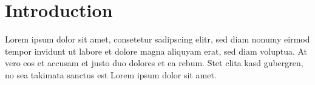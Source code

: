 \documentclass{article}
\begin{document}
\chapter{Introduction}
Lorem ipsum dolor sit amet, consetetur sadipscing elitr, sed diam nonumy eirmod
tempor invidunt ut labore et dolore magna aliquyam erat, sed diam voluptua. At
vero eos et accusam et justo duo dolores et ea rebum. Stet clita kasd
gubergren, no sea takimata sanctus est Lorem ipsum dolor sit amet.

\printbibheading[heading=bibintoc]
\printbibliography[heading=subbibliography,type=article,title={Articles}]
\printbibliography[heading=subbibliography,type=book,title={Monographs \& Textbooks}]
\end{document}
